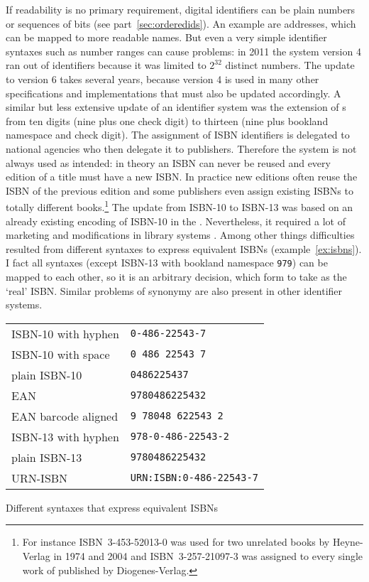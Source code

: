 If readability is no primary requirement, digital identifiers can be plain 
numbers or sequences of bits (see part~\ref{sec:orderedids}). An example are 
 addresses, which can be mapped to more readable  names.
But even a very simple identifier syntaxes such as number ranges can cause 
problems: in 2011 the  system version 4 ran out of identifiers because
it was limited to $2^{32}$ distinct numbers. The update to  version 6 
takes several years, because version 4 is used in many other specifications and 
implementations that must also be updated accordingly. A similar but less 
extensive update of an identifier
system was the extension of s
from ten digits (nine plus one check digit) to thirteen (nine plus 
bookland namespace and check digit). The assignment of ISBN identifiers
is delegated to national agencies who then delegate it to publishers. Therefore
the system is not always used as intended: in theory an ISBN can 
never be reused and every edition of a title must have a new ISBN. In practice
new editions often reuse the ISBN of the previous edition and some publishers 
even assign existing ISBNs to totally different books.\footnote{For instance
ISBN~3-453-52013-0 was used for two unrelated books by Heyne-Verlag
in 1974 and 2004 and ISBN~3-257-21097-3 was assigned to every single work 
of  published by Diogenes-Verlag.} The update from 
ISBN-10 to ISBN-13 was based on an already existing encoding  of ISBN-10 in
the . Nevertheless, it required a lot 
of marketing and modifications in library 
systems \cite{vanHalm2005}. Among other things difficulties resulted 
from different syntaxes to express equivalent ISBNs (example~\ref{ex:isbns}).
I fact all syntaxes (except ISBN-13 with bookland namespace \texttt{979}) 
can be mapped to each other, so it is an arbitrary decision, which form to 
take as the `real' ISBN. Similar problems of synonymy are also present in
other identifier systems.

\begin{example}[h]
\centering
\begin{tabular}{l|l}
ISBN-10 with hyphen & \texttt{0-486-22543-7} \\
ISBN-10 with space  & \texttt{0 486 22543 7} \\
plain ISBN-10 & \texttt{0486225437} \\
EAN & \texttt{9780486225432} \\
EAN barcode aligned & \texttt{9 78048 622543 2} \\
ISBN-13 with hyphen & \texttt{978-0-486-22543-2} \\
plain ISBN-13 & \texttt{9780486225432} \\
URN-ISBN & \texttt{URN:ISBN:0-486-22543-7} \\ %
\end{tabular}
\caption{Different syntaxes that express equivalent ISBNs}
\label{ex:isbns}
\end{example}


